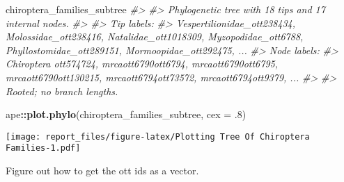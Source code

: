 \documentclass[]{article}
\newenvironment{Shaded}{\begin{snugshade}}{\end{snugshade}}
\newcommand{\CommentTok}[1]{\textcolor[rgb]{0.56,0.35,0.01}{\textit{#1}}}
\newcommand{\DataTypeTok}[1]{\textcolor[rgb]{0.13,0.29,0.53}{#1}}
\newcommand{\FloatTok}[1]{\textcolor[rgb]{0.00,0.00,0.81}{#1}}
\newcommand{\KeywordTok}[1]{\textcolor[rgb]{0.13,0.29,0.53}{\textbf{#1}}}
\newcommand{\NormalTok}[1]{#1}
\newcommand{\OperatorTok}[1]{\textcolor[rgb]{0.81,0.36,0.00}{\textbf{#1}}}
\begin{document}
\begin{Shaded}
\begin{Highlighting}[]
\NormalTok{chiroptera_families_subtree}
\CommentTok{#> }
\CommentTok{#> Phylogenetic tree with 18 tips and 17 internal nodes.}
\CommentTok{#> }
\CommentTok{#> Tip labels:}
\CommentTok{#>  Vespertilionidae_ott238434, Molossidae_ott238416, Natalidae_ott1018309, Myzopodidae_ott6788, Phyllostomidae_ott289151, Mormoopidae_ott292475, ...}
\CommentTok{#> Node labels:}
\CommentTok{#>  Chiroptera ott574724, mrcaott6790ott6794, mrcaott6790ott6795, mrcaott6790ott130215, mrcaott6794ott73572, mrcaott6794ott9379, ...}
\CommentTok{#> }
\CommentTok{#> Rooted; no branch lengths.}
\end{Highlighting}
\end{Shaded}

\begin{Shaded}
\begin{Highlighting}[]
\NormalTok{ape}\OperatorTok{::}\KeywordTok{plot.phylo}\NormalTok{(chiroptera_families_subtree, }\DataTypeTok{cex =} \FloatTok{.8}\NormalTok{)}
\end{Highlighting}
\end{Shaded}

\texttt{[image: report\_files/figure-latex/Plotting Tree Of Chiroptera Families-1.pdf]}

Figure out how to get the ott ids as a vector.

\begin{Shaded}
\end{Shaded}

\begin{Shaded}
\end{Shaded}
\end{document}
